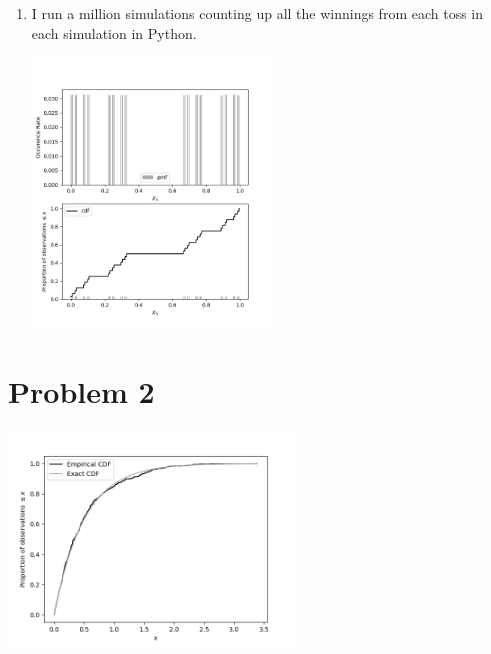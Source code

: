 \documentclass{article}
\newcommand{\1}{\mathbf{1}}
\begin{document}
\begin{enumerate}
	\newpage
	\item I run a million simulations counting up all the winnings from each toss in each simulation in Python.
	\begin{center}
    \includegraphics[width=2.5in]{STATS509/HW2/HW2Figures/problem1c.png}
    \end{center}
    
\end{enumerate}


\newpage
\section*{Problem 2}
\begin{center}
    \includegraphics[width=3in]{STATS509/HW2/HW2Figures/problem2.png}
\end{center}



\newpage
\end{document}
